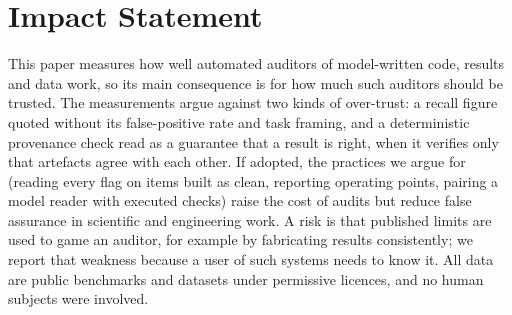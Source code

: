 \documentclass{article}
\begin{document}







\section*{Impact Statement}
This paper measures how well automated auditors of model-written code, results and data work, so its
main consequence is for how much such auditors should be trusted. The measurements argue against two
kinds of over-trust: a recall figure quoted without its false-positive rate and task framing, and a
deterministic provenance check read as a guarantee that a result is right, when it verifies only that
artefacts agree with each other. If adopted, the practices we argue for (reading every flag on items
built as clean, reporting operating points, pairing a model reader with executed checks) raise the
cost of audits but reduce false assurance in scientific and engineering work. A risk is that
published limits are used to game an auditor, for example by fabricating results consistently; we
report that weakness because a user of such systems needs to know it. All data are public benchmarks
and datasets under permissive licences, and no human subjects were involved.




\newpage
\appendix
\onecolumn







\end{document}
